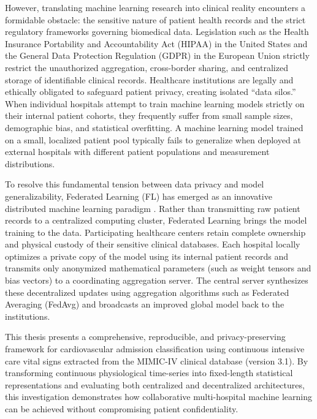 However, translating machine learning research into clinical reality encounters a formidable obstacle: the sensitive nature of patient health records and the strict regulatory frameworks governing biomedical data. Legislation such as the Health Insurance Portability and Accountability Act (HIPAA) in the United States and the General Data Protection Regulation (GDPR) in the European Union strictly restrict the unauthorized aggregation, cross-border sharing, and centralized storage of identifiable clinical records. Healthcare institutions are legally and ethically obligated to safeguard patient privacy, creating isolated ``data silos.'' When individual hospitals attempt to train machine learning models strictly on their internal patient cohorts, they frequently suffer from small sample sizes, demographic bias, and statistical overfitting. A machine learning model trained on a small, localized patient pool typically fails to generalize when deployed at external hospitals with different patient populations and measurement distributions.

To resolve this fundamental tension between data privacy and model generalizability, Federated Learning (FL) has emerged as an innovative distributed machine learning paradigm \citep{mcmahan2017communication, rieke2020future}. Rather than transmitting raw patient records to a centralized computing cluster, Federated Learning brings the model training to the data. Participating healthcare centers retain complete ownership and physical custody of their sensitive clinical databases. Each hospital locally optimizes a private copy of the model using its internal patient records and transmits only anonymized mathematical parameters (such as weight tensors and bias vectors) to a coordinating aggregation server. The central server synthesizes these decentralized updates using aggregation algorithms such as Federated Averaging (FedAvg) and broadcasts an improved global model back to the institutions.

This thesis presents a comprehensive, reproducible, and privacy-preserving framework for cardiovascular admission classification using continuous intensive care vital signs extracted from the MIMIC-IV clinical database (version 3.1). By transforming continuous physiological time-series into fixed-length statistical representations and evaluating both centralized and decentralized architectures, this investigation demonstrates how collaborative multi-hospital machine learning can be achieved without compromising patient confidentiality.


